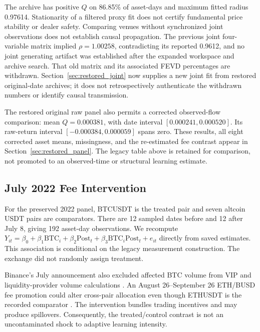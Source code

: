 \documentclass[12pt]{article}
\theoremstyle{definition}
\theoremstyle{remark}
\begin{document}
The archive has positive $Q$ on 86.85\% of asset-days and maximum fitted radius 0.97614. Stationarity of a filtered proxy fit does not certify fundamental price stability or dealer safety. Comparing venues without synchronized joint observations does not establish causal propagation. The previous joint four-variable matrix implied $\rho=1.00258$, contradicting its reported 0.9612, and no joint generating artifact was established after the expanded workspace and archive search. That old matrix and its associated FEVD percentages are withdrawn. Section~\ref{sec:restored_joint} now supplies a new joint fit from restored original-date archives; it does not retrospectively authenticate the withdrawn numbers or identify causal transmission.


The restored original raw panel also permits a corrected observed-flow comparison: mean $Q=0.000381$, with date interval $[0.000241,0.000520]$. Its raw-return interval $[-0.000384,0.000059]$ spans zero. These results, all eight corrected asset means, missingness, and the re-estimated fee contrast appear in Section~\ref{sec:restored_panel}. The legacy table above is retained for comparison, not promoted to an observed-time or structural learning estimate.

\subsection{July 2022 Fee Intervention}
For the preserved 2022 panel, BTCUSDT is the treated pair and seven altcoin USDT pairs are comparators. There are 12 sampled dates before and 12 after July 8, giving 192 asset-day observations. We recompute $Y_{it}=\beta_0+\beta_1\mathrm{BTC}_i+\beta_2\mathrm{Post}_t+\beta_3\mathrm{BTC}_i\mathrm{Post}_t+e_{it}$ directly from saved estimates. This association is conditional on the legacy measurement construction. The exchange did not randomly assign treatment.

Binance's July announcement also excluded affected BTC volume from VIP and liquidity-provider volume calculations \citep{binance2022volume}. An August 26--September 26 ETH/BUSD fee promotion could alter cross-pair allocation even though ETHUSDT is the recorded comparator \citep{binance2022eth}. The intervention bundles trading incentives and may produce spillovers. Consequently, the treated/control contrast is not an uncontaminated shock to adaptive learning intensity.
\end{document}
